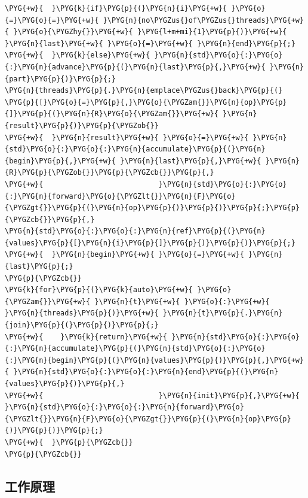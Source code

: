 \begin{codeblockbg}
\begin{Verbatim}[commandchars=\\\{\},breaklines=true,breakanywhere=true,fontsize=\codefont,xleftmargin=17bp]
\PYG{+w}{  }\PYG{k}{if}\PYG{p}{(}\PYG{n}{i}\PYG{+w}{ }\PYG{o}{=}\PYG{o}{=}\PYG{+w}{ }\PYG{n}{no\PYGZus{}of\PYGZus{}threads}\PYG{+w}{ }\PYG{o}{\PYGZhy{}}\PYG{+w}{ }\PYG{l+m+mi}{1}\PYG{p}{)}\PYG{+w}{ }\PYG{n}{last}\PYG{+w}{ }\PYG{o}{=}\PYG{+w}{ }\PYG{n}{end}\PYG{p}{;}
\PYG{+w}{  }\PYG{k}{else}\PYG{+w}{ }\PYG{n}{std}\PYG{o}{:}\PYG{o}{:}\PYG{n}{advance}\PYG{p}{(}\PYG{n}{last}\PYG{p}{,}\PYG{+w}{ }\PYG{n}{part}\PYG{p}{)}\PYG{p}{;}
\PYG{n}{threads}\PYG{p}{.}\PYG{n}{emplace\PYGZus{}back}\PYG{p}{(}
\PYG{p}{[}\PYG{o}{=}\PYG{p}{,}\PYG{o}{\PYGZam{}}\PYG{n}{op}\PYG{p}{]}\PYG{p}{(}\PYG{n}{R}\PYG{o}{\PYGZam{}}\PYG{+w}{ }\PYG{n}{result}\PYG{p}{)}\PYG{p}{\PYGZob{}}
\PYG{+w}{  }\PYG{n}{result}\PYG{+w}{ }\PYG{o}{=}\PYG{+w}{ }\PYG{n}{std}\PYG{o}{:}\PYG{o}{:}\PYG{n}{accumulate}\PYG{p}{(}\PYG{n}{begin}\PYG{p}{,}\PYG{+w}{ }\PYG{n}{last}\PYG{p}{,}\PYG{+w}{ }\PYG{n}{R}\PYG{p}{\PYGZob{}}\PYG{p}{\PYGZcb{}}\PYG{p}{,}
\PYG{+w}{                           }\PYG{n}{std}\PYG{o}{:}\PYG{o}{:}\PYG{n}{forward}\PYG{o}{\PYGZlt{}}\PYG{n}{F}\PYG{o}{\PYGZgt{}}\PYG{p}{(}\PYG{n}{op}\PYG{p}{)}\PYG{p}{)}\PYG{p}{;}\PYG{p}{\PYGZcb{}}\PYG{p}{,}
\PYG{n}{std}\PYG{o}{:}\PYG{o}{:}\PYG{n}{ref}\PYG{p}{(}\PYG{n}{values}\PYG{p}{[}\PYG{n}{i}\PYG{p}{]}\PYG{p}{)}\PYG{p}{)}\PYG{p}{;}
\PYG{+w}{  }\PYG{n}{begin}\PYG{+w}{ }\PYG{o}{=}\PYG{+w}{ }\PYG{n}{last}\PYG{p}{;}
\PYG{p}{\PYGZcb{}}
\PYG{k}{for}\PYG{p}{(}\PYG{k}{auto}\PYG{+w}{ }\PYG{o}{\PYGZam{}}\PYG{+w}{ }\PYG{n}{t}\PYG{+w}{ }\PYG{o}{:}\PYG{+w}{ }\PYG{n}{threads}\PYG{p}{)}\PYG{+w}{ }\PYG{n}{t}\PYG{p}{.}\PYG{n}{join}\PYG{p}{(}\PYG{p}{)}\PYG{p}{;}
\PYG{+w}{    }\PYG{k}{return}\PYG{+w}{ }\PYG{n}{std}\PYG{o}{:}\PYG{o}{:}\PYG{n}{accumulate}\PYG{p}{(}\PYG{n}{std}\PYG{o}{:}\PYG{o}{:}\PYG{n}{begin}\PYG{p}{(}\PYG{n}{values}\PYG{p}{)}\PYG{p}{,}\PYG{+w}{ }\PYG{n}{std}\PYG{o}{:}\PYG{o}{:}\PYG{n}{end}\PYG{p}{(}\PYG{n}{values}\PYG{p}{)}\PYG{p}{,}
\PYG{+w}{                           }\PYG{n}{init}\PYG{p}{,}\PYG{+w}{ }\PYG{n}{std}\PYG{o}{:}\PYG{o}{:}\PYG{n}{forward}\PYG{o}{\PYGZlt{}}\PYG{n}{F}\PYG{o}{\PYGZgt{}}\PYG{p}{(}\PYG{n}{op}\PYG{p}{)}\PYG{p}{)}\PYG{p}{;}
\PYG{+w}{  }\PYG{p}{\PYGZcb{}}
\PYG{p}{\PYGZcb{}}
\end{Verbatim}
\end{codeblockbg}



\subsection{工作原理}



